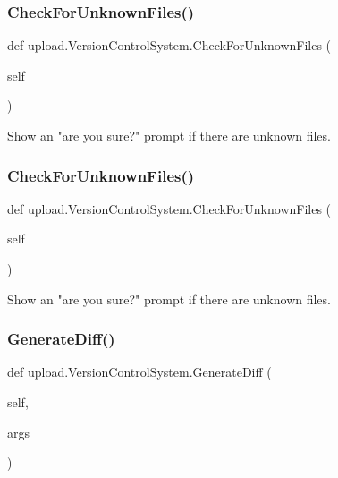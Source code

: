 \subsubsection{\texorpdfstring{CheckForUnknownFiles()}{CheckForUnknownFiles()}\hspace{0.1cm}{\footnotesize\ttfamily [1/2]}}
{\footnotesize\ttfamily def upload.\+Version\+Control\+System.\+Check\+For\+Unknown\+Files (\begin{DoxyParamCaption}\item[{}]{self }\end{DoxyParamCaption})}

\begin{DoxyVerb}Show an "are you sure?" prompt if there are unknown files.\end{DoxyVerb}
 \mbox{\label{classupload_1_1VersionControlSystem_ad2923d691a1b1047e9359c5b7c1c103f}} 
\subsubsection{\texorpdfstring{CheckForUnknownFiles()}{CheckForUnknownFiles()}\hspace{0.1cm}{\footnotesize\ttfamily [2/2]}}
{\footnotesize\ttfamily def upload.\+Version\+Control\+System.\+Check\+For\+Unknown\+Files (\begin{DoxyParamCaption}\item[{}]{self }\end{DoxyParamCaption})}

\begin{DoxyVerb}Show an "are you sure?" prompt if there are unknown files.\end{DoxyVerb}
 \mbox{\label{classupload_1_1VersionControlSystem_aa5eb260c96e7016dab36b5fc136c9f49}} 
\subsubsection{\texorpdfstring{GenerateDiff()}{GenerateDiff()}\hspace{0.1cm}{\footnotesize\ttfamily [1/2]}}
{\footnotesize\ttfamily def upload.\+Version\+Control\+System.\+Generate\+Diff (\begin{DoxyParamCaption}\item[{}]{self,  }\item[{}]{args }\end{DoxyParamCaption})}

